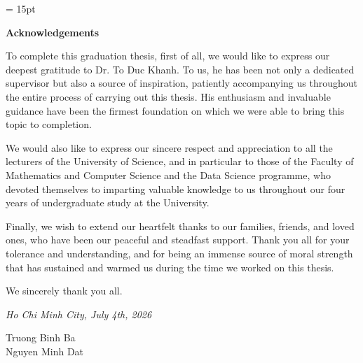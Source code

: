 \clearpage                    %
\vspace*{1cm}                 %
\baselineskip = 15pt
\setlength{\headheight}{15pt}
\begin{center}                %
    \textbf{\fontsize{20}{24}\selectfont Acknowledgements} %
\end{center}
\vspace{1cm}  

To complete this graduation thesis, first of all, we would like to express our deepest gratitude to Dr. To Duc Khanh. To us, he has been not only a dedicated supervisor but also a source of inspiration, patiently accompanying us throughout the entire process of carrying out this thesis. His enthusiasm and invaluable guidance have been the firmest foundation on which we were able to bring this topic to completion.

We would also like to express our sincere respect and appreciation to all the lecturers of the University of Science, and in particular to those of the Faculty of Mathematics and Computer Science and the Data Science programme, who devoted themselves to imparting valuable knowledge to us throughout our four years of undergraduate study at the University.

Finally, we wish to extend our heartfelt thanks to our families, friends, and loved ones, who have been our peaceful and steadfast support. Thank you all for your tolerance and understanding, and for being an immense source of moral strength that has sustained and warmed us during the time we worked on this thesis.

We sincerely thank you all.
\vspace{1cm}
\begin{flushright}
\begin{minipage}{9cm}
\centering
\textit{Ho Chi Minh City, July 4th, 2026}
\vspace{0.3cm}

Truong Binh Ba \\
Nguyen Minh Dat
\end{minipage}
\end{flushright}
\vspace*{\fill} %